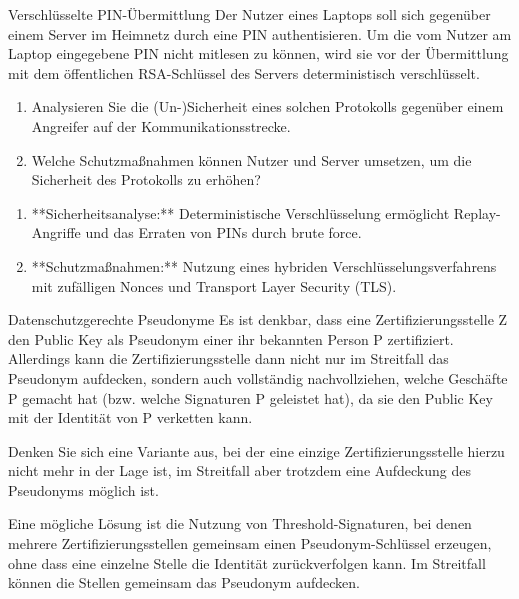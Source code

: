 \documentclass{article}
\begin{document}
\setcounter{subsection}{167}
\begin{exercise}{Verschlüsselte PIN-Übermittlung}
  Der Nutzer eines Laptops soll sich gegenüber einem Server im Heimnetz durch eine PIN authentisieren. Um die vom Nutzer am Laptop eingegebene PIN nicht mitlesen zu können, wird sie vor der Übermittlung mit dem öffentlichen RSA-Schlüssel des Servers deterministisch verschlüsselt.
  \begin{enumerate}
    \item Analysieren Sie die (Un-)Sicherheit eines solchen Protokolls gegenüber einem Angreifer auf der Kommunikationsstrecke.
    \item Welche Schutzmaßnahmen können Nutzer und Server umsetzen, um die Sicherheit des Protokolls zu erhöhen?
  \end{enumerate}

  \begin{solution}
    \begin{enumerate}
      \item **Sicherheitsanalyse:** Deterministische Verschlüsselung ermöglicht Replay-Angriffe und das Erraten von PINs durch brute force.
      \item **Schutzmaßnahmen:** Nutzung eines hybriden Verschlüsselungsverfahrens mit zufälligen Nonces und Transport Layer Security (TLS).
    \end{enumerate}
  \end{solution}
\end{exercise}

\setcounter{subsection}{188}
\begin{exercise}{Datenschutzgerechte Pseudonyme}
  Es ist denkbar, dass eine Zertifizierungsstelle Z den Public Key als Pseudonym einer ihr bekannten Person P zertifiziert. Allerdings kann die Zertifizierungsstelle dann nicht nur im Streitfall das Pseudonym aufdecken, sondern auch vollständig nachvollziehen, welche Geschäfte P gemacht hat (bzw. welche Signaturen P geleistet hat), da sie den Public Key mit der Identität von P verketten kann.

  Denken Sie sich eine Variante aus, bei der eine einzige Zertifizierungsstelle hierzu nicht mehr in der Lage ist, im Streitfall aber trotzdem eine Aufdeckung des Pseudonyms möglich ist.

  \begin{solution}
    Eine mögliche Lösung ist die Nutzung von Threshold-Signaturen, bei denen mehrere Zertifizierungsstellen gemeinsam einen Pseudonym-Schlüssel erzeugen, ohne dass eine einzelne Stelle die Identität zurückverfolgen kann. Im Streitfall können die Stellen gemeinsam das Pseudonym aufdecken.
  \end{solution}
\end{exercise}
\end{document}

